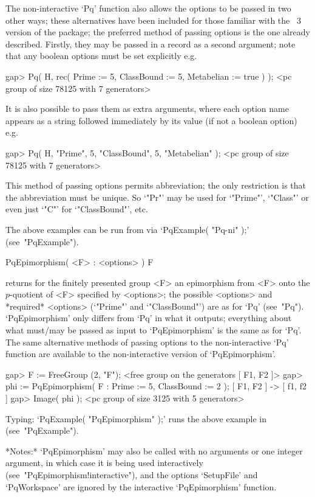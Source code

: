 The non-interactive `Pq' function also allows the options to be passed in
two other ways; these alternatives have been included for those  familiar
with the {\GAP}~3 version of the {\ANUPQ} package; the  preferred  method
of passing options is the one already described.  Firstly,  they  may  be
passed in a record as a second argument; note that  any  boolean  options
must be set explicitly e.g.

\beginexample
gap> Pq( H, rec( Prime := 5, ClassBound := 5, Metabelian := true ) );
<pc group of size 78125 with 7 generators>
\endexample

It is also possible to pass them as extra arguments,  where  each  option
name appears as a string followed immediately by  its  value  (if  not  a
boolean option) e.g.

\beginexample
gap> Pq( H, "Prime", 5, "ClassBound", 5, "Metabelian" );             
<pc group of size 78125 with 7 generators>
\endexample

This method of passing options permits abbreviation; the only restriction
is that the abbreviation must be  unique.  So  `"Pr"'  may  be  used  for
`"Prime"', `"Class"' or even just `"C"' for `"ClassBound"', etc.

The above examples can be run  from  {\GAP}  via  `PqExample( "Pq-ni" );'
(see~"PqExample").

\>PqEpimorphism( <F> : <options> ) F

returns for the finitely presented group <F> an epimorphism from <F> onto
the $p$-quotient of <F> specified by <options>;  the  possible  <options>
and *required* <options> (`"Prime"' and `"ClassBound"') are as  for  `Pq'
(see~"Pq"). `PqEpimorphism' only differs from `Pq' in  what  it  outputs;
everything about what must/may be passed as input to  `PqEpimorphism'  is
the same as for `Pq'. The same alternative methods of passing options  to
the non-interactive `Pq' function are available  to  the  non-interactive
version of `PqEpimorphism'.

\beginexample
gap> F := FreeGroup (2, "F");
<free group on the generators [ F1, F2 ]>
gap> phi := PqEpimorphism( F : Prime := 5, ClassBound := 2 );
[ F1, F2 ] -> [ f1, f2 ]
gap> Image( phi );
<pc group of size 3125 with 5 generators>
\endexample

Typing: `PqExample( "PqEpimorphism" );' runs the above example in  {\GAP}
(see~"PqExample").

*Notes:* `PqEpimorphism' may also be called  with  no  arguments  or  one
integer  argument,  in  which  case  it  is  being   used   interactively
(see~"PqEpimorphism!interactive"),  and  the  options   `SetupFile'   and
`PqWorkspace' are ignored by the interactive `PqEpimorphism' function.

